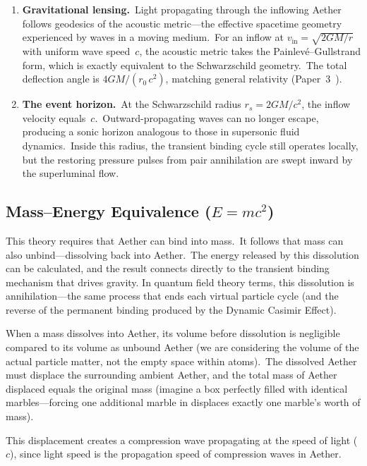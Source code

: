 ﻿\documentclass[12pt,letterpaper]{article}
\newcommand{\vin}{v_{\mathrm{in}}}
\newcommand{\rs}{r_s}
\begin{document}
\begin{enumerate}[leftmargin=2em]
  \item \textbf{Gravitational lensing.}\ Light propagating through the inflowing
    Aether follows geodesics of the acoustic metric---the effective spacetime
    geometry experienced by waves in a moving medium.\ For an inflow at
    $\vin = \sqrt{2GM/r}$ with uniform wave speed~$c$, the acoustic metric
    takes the Painlev\'e--Gullstrand form, which is exactly equivalent to the
    Schwarzschild geometry.\ The total deflection angle is $4GM/(r_0\,c^2)$,
    matching general relativity (Paper~3~\cite{otto-gravity}).

  \item \textbf{The event horizon.}\ At the Schwarzschild radius $\rs = 2GM/c^2$,
    the inflow velocity equals~$c$.\ Outward-propagating waves can no longer escape,
    producing a sonic horizon analogous to those in supersonic fluid dynamics.\
    Inside this radius, the transient binding cycle still operates locally, but the
    restoring pressure pulses from pair annihilation are swept inward by the
    superluminal flow.
\end{enumerate}


\subsection{Mass--Energy Equivalence (\texorpdfstring{$E = mc^2$}{E = mc²})}

This theory requires that Aether can bind into mass.\ It follows that mass can also unbind---dissolving back into Aether.\ The energy released by this dissolution can be calculated,
and the result connects directly to the transient binding mechanism that drives gravity.
In quantum field theory terms, this dissolution is annihilation---the same process that
ends each virtual particle cycle (and the reverse of the permanent binding produced by
the Dynamic Casimir Effect).

When a mass dissolves into Aether, its volume before dissolution is negligible compared
to its volume as unbound Aether (we are considering the volume of the actual particle
matter, not the empty space within atoms).\ The dissolved Aether must displace the
surrounding ambient Aether, and the total mass of Aether displaced equals the original
mass (imagine a box perfectly filled with identical marbles---forcing one additional marble
in displaces exactly one marble's worth of mass).

This displacement creates a compression wave propagating at the speed of light ($c$), since
light speed is the propagation speed of compression waves in Aether.
\end{document}
